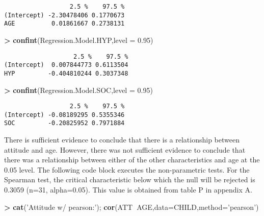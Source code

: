 \documentclass[]{article}
\newenvironment{Shaded}{\begin{snugshade}}{\end{snugshade}}
\newcommand{\KeywordTok}[1]{\textcolor[rgb]{0.13,0.29,0.53}{\textbf{#1}}}
\newcommand{\DataTypeTok}[1]{\textcolor[rgb]{0.13,0.29,0.53}{#1}}
\newcommand{\FloatTok}[1]{\textcolor[rgb]{0.00,0.00,0.81}{#1}}
\newcommand{\StringTok}[1]{\textcolor[rgb]{0.31,0.60,0.02}{#1}}
\newcommand{\OperatorTok}[1]{\textcolor[rgb]{0.81,0.36,0.00}{\textbf{#1}}}
\newcommand{\NormalTok}[1]{#1}
\begin{document}
\begin{verbatim}
                  2.5 %    97.5 %
(Intercept) -2.30478406 0.1770673
AGE          0.01861667 0.2738131
\end{verbatim}

\begin{Shaded}
\begin{Highlighting}[]
\OperatorTok{>}\StringTok{ }\KeywordTok{confint}\NormalTok{(Regression.Model.HYP,}\DataTypeTok{level =} \FloatTok{0.95}\NormalTok{)}
\end{Highlighting}
\end{Shaded}

\begin{verbatim}
                   2.5 %    97.5 %
(Intercept)  0.007844773 0.6113504
HYP         -0.404810244 0.3037348
\end{verbatim}

\begin{Shaded}
\begin{Highlighting}[]
\OperatorTok{>}\StringTok{ }\KeywordTok{confint}\NormalTok{(Regression.Model.SOC,}\DataTypeTok{level =} \FloatTok{0.95}\NormalTok{)}
\end{Highlighting}
\end{Shaded}

\begin{verbatim}
                  2.5 %    97.5 %
(Intercept) -0.08189295 0.5355346
SOC         -0.20825952 0.7971884
\end{verbatim}

There is sufficient evidence to conclude that there is a relationship
between attitude and age. However, there was not sufficient evidence to
conclude that there was a relationship between either of the other
characteristics and age at the 0.05 level. The following code block
executes the non-parametric tests. For the Spearman test, the critical
characteristic below which the null will be rejected is 0.3059 (n=31,
alpha=0.05). This value is obtained from table P in appendix A.

\begin{Shaded}
\begin{Highlighting}[]
\OperatorTok{>}\StringTok{ }\KeywordTok{cat}\NormalTok{(}\StringTok{'Attitude w/ pearson:'}\NormalTok{); }\KeywordTok{cor}\NormalTok{(ATT}\OperatorTok{~}\NormalTok{AGE,}\DataTypeTok{data=}\NormalTok{CHILD,}\DataTypeTok{method=}\StringTok{'pearson'}\NormalTok{)}
\end{Highlighting}
\end{Shaded}
\end{document}
